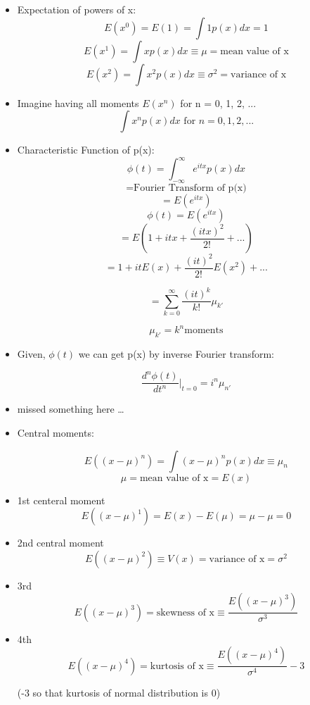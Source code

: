 \begin{itemize}
      \item Expectation of powers of x:
            \[ E(x^0) = E(1) = \int 1 p(x) dx = 1\]
            \[ E(x^1) = \int x p(x) dx \equiv \mu = \text{mean value of x}\]
            \[ E(x^2) = \int x^2 p(x) dx \equiv \sigma^2 = \text{variance of x}\]

      \item Imagine having all moments $E(x^n)$ for n = 0, 1, 2, ...
            \[ \int x^n p(x) dx \text{ for } n = 0, 1, 2, ...\]

      \item Characteristic Function of p(x):
            \[ \phi(t) = \int_{-\infty}^{\infty} e^{itx} p(x) dx \]
            \[ = \text{Fourier Transform of p(x)}\]
            \[ = E(e^{itx})\]
            \[ \phi(t) = E(e^{itx}) \]
            \[ = E (1 + i t x + \frac{(itx)^2}{2!} + ... ) \]
            \[ = 1 + it E(x) + \frac{(it)^2}{2!} E(x^2) + ... \]

            \[ = \sum_{k=0}^{\infty} \frac{(it)^k}{k!} \mu_{k'} \]

            \[ \mu_{k'} = k^n \text{moments} \]

      \item Given, $\phi(t)$ we can get p(x) by inverse Fourier transform:

            \[ \frac{d^n \phi(t)}{dt^n} \left| \right._{t=0} = i^n \mu_{n'} \]

      \item missed something here \dots

      \item Central moments:

            \[ E((x-\mu)^n) = \int (x-\mu)^n p(x) dx \equiv \mu_n \]
            \[ \mu = \text{mean value of x} = E(x) \]
      \item 1st centeral moment
            \[ E((x-\mu)^1) = E(x) - E(\mu) = \mu - \mu = 0\]
      \item 2nd central moment
            \[ E((x-\mu)^2) \equiv V(x) = \text{variance of x} = \sigma^2 \]
      \item 3rd
            \[ E((x-\mu)^3) = \text{skewness of x} \equiv \frac{E((x-\mu)^3)}{\sigma^3} \]
      \item 4th
            \[ E((x-\mu)^4) = \text{kurtosis of x} \equiv \frac{E((x-\mu)^4)}{\sigma^4} - 3 \]

            (-3 so that kurtosis of normal distribution is 0)
\end{itemize}
